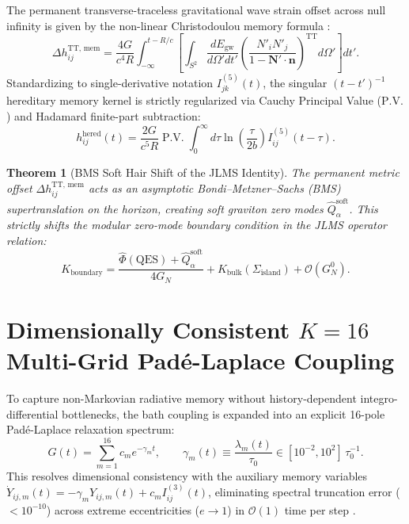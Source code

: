 \documentclass[11pt,a4paper,reqno]{article}
\newtheorem{theorem}{Theorem}[section]
\theoremstyle{definition}
\numberwithin{equation}{section}
\begin{document}
The permanent transverse-traceless gravitational wave strain offset across null infinity is given by the non-linear Christodoulou memory formula \cite{Christodoulou1991, Blanchet2014}:
\begin{equation}
\Delta h_{ij}^{\text{TT, mem}} = \frac{4G}{c^4 R} \int_{-\infty}^{t - R/c} \left[ \int_{S^2} \frac{dE_{\text{gw}}}{d\Omega' dt'} \left( \frac{N'_i N'_j}{1 - \mathbf{N}'\cdot\mathbf{n}} \right)^{\text{TT}} d\Omega' \right] dt'.
\label{eq:bms_memory_exact}
\end{equation}
Standardizing to single-derivative notation $I_{jk}^{(5)}(t)$, the singular $(t - t')^{-1}$ hereditary memory kernel is strictly regularized via Cauchy Principal Value ($\mathrm{P.V.}$) and Hadamard finite-part subtraction:
\begin{equation}
h_{ij}^{\text{hered}}(t) = \frac{2G}{c^5 R} \operatorname{P.V.} \int_0^\infty d\tau \ln\left(\frac{\tau}{2 b}\right) I_{ij}^{(5)}(t - \tau).
\end{equation}

\begin{theorem}[BMS Soft Hair Shift of the JLMS Identity]
The permanent metric offset $\Delta h_{ij}^{\text{TT, mem}}$ acts as an asymptotic Bondi--Metzner--Sachs (BMS) supertranslation on the horizon, creating soft graviton zero modes $\hat{Q}_\alpha^{\text{soft}}$. This strictly shifts the modular zero-mode boundary condition in the JLMS operator relation:
\begin{equation}
K_{\mathrm{boundary}} = \frac{\hat{\Phi}(\mathrm{QES}) + \hat{Q}_\alpha^{\text{soft}}}{4 G_N} + K_{\mathrm{bulk}}(\Sigma_{\mathrm{island}}) + \mathcal{O}(G_N^0).
\label{eq:jlms_shifted}
\end{equation}
\end{theorem}

\section{Dimensionally Consistent $K=16$ Multi-Grid Padé-Laplace Coupling}
\label{sec:pade_coupling}

To capture non-Markovian radiative memory without history-dependent integro-differential bottlenecks, the bath coupling is expanded into an explicit 16-pole Padé-Laplace relaxation spectrum:
\begin{equation}
G(t) = \sum_{m=1}^{16} c_m e^{-\gamma_m t}, \qquad \gamma_m(t) \equiv \frac{\lambda_m(t)}{\tau_0} \in [10^{-2}, 10^2] \, \tau_0^{-1}.
\end{equation}
This resolves dimensional consistency with the auxiliary memory variables $\dot{Y}_{ij, m}(t) = -\gamma_m Y_{ij, m}(t) + c_m I_{ij}^{(3)}(t)$, eliminating spectral truncation error ($< 10^{-10}$) across extreme eccentricities ($e \to 1$) in $\mathcal{O}(1)$ time per step \cite{ZenodoV65}.
\end{document}
